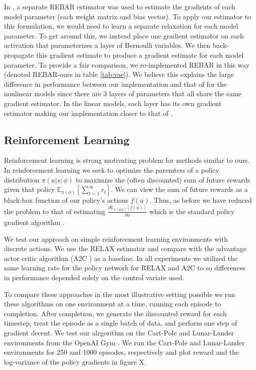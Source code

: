 \documentclass{article}
\begin{document}
In \citep{tucker2017rebar}, a separate REBAR estimator was used to estimate the gradients of each model parameter (each weight matrix and bias vector).
To apply our estimator to this formulation, we would need to learn a separate relaxation for each model parameter.
To get around this, we instead place one gradient estimator on each activation that parameterizes a layer of Bernoulli variables.
We then back-propagate this gradient estimate to produce a gradient estimate for each model parameter.
To provide a fair comparison, we re-implemented REBAR in this way (denoted REBAR-ours in table \ref{tab:vae}).
We believe this explains the large difference in performance between our implementation and that of \citep{tucker2017rebar} for the nonlinear models since there are 3 layers of parameters that all share the same gradient estimator.
In the linear models, each layer has its own gradient estimator making our implementation closer to that of \citep{tucker2017rebar}.



\subsection{Reinforcement Learning}
Reinforcement learning is strong motivating problem for methods similar to ours. In reinforcement learning we seek to optimize the paremters of a policy distribution $\pi(a|s;\phi)$ to maximize the (often discounted) sum of future rewards given that policy $\mathbb{E}_{\pi(\phi)}[\sum_{t=1}^{\infty} r_t]$. We can view the sum of future rewards as a black-box function of our policy's actions $f(a)$. Thus, as before we have reduced the problem to that of estimating $\frac{\partial \mathbb{E}_{\pi(a|\phi)}[f(a)]}{\partial \phi}$ which is the standard policy gradient algorithm \cite{POLICY GRADIENT}. 

We test our approach on simple reinforcement learning environments with discrete actions. We use the RELAX estimator and compare with the advantage actor critic algorithm (A2C \cite{A2C}) as a baseline. In all experiments we utilized the same learning rate for the policy network for RELAX and A2C to so differences in performance depended solely on the control variate used. 

To compare these approaches in the most illustrative setting possible we run these algorithms on one environment at a time, running each episode to completion. After completion, we generate the discounted reward for each timestep, treat the episode as a single batch of data, and perform one step of gradient decent. We test our alrgorithm on the Cart-Pole and Lunar-Lander environments from the OpenAI Gym \cite{gym}. We run the Cart-Pole and Lunar-Lander environments for 250 and 1000 episodes, respectively and plot reward and the log-variance of the policy gradients in figure X.
\end{document}

